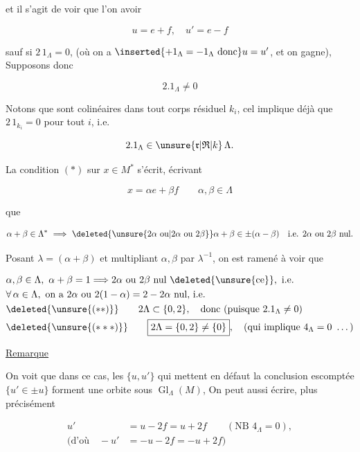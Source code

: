 

et il s'agit de voir que l'on  avoir

\[
u=e+f,\quad u'=e-f
\]

sauf  si $2\,1_\Lambda=0$, (où on a $\inserted{+1_\Lambda=-1_\Lambda\ \text{donc}}u=u'$, et on gagne),  Supposons donc

\[
2.1_\Lambda\ne0
\]

Notons que  sont colinéaires dans tout corps résiduel $k_i$, cel implique déjà que $2\,1_{k_i}=0$ pour tout $i$, i.e.

\[
2.1_\Lambda\in\unsure{\mathfrak r|\mathfrak R|k}\,\Lambda.
\]

La condition $(*)$ sur $x\in M^*$ s'écrit, écrivant

\[
x=\alpha e+\beta f\qquad\alpha,\beta\in\Lambda
\]

que

\[
\alpha+\beta\in\Lambda^*\ \Longrightarrow\ \deleted{\unsure{2\alpha\ \text{ou}|2\alpha\ \text{ou }2\beta}}\alpha+\beta\in\pm(\alpha-\beta)\quad\text{i.e. }2\alpha\ \text{ou }2\beta\ \text{nul.}
\]

Posant $\lambda=(\alpha+\beta)$ et multipliant $\alpha,\beta$ par $\lambda^{-1}$, on est ramené à voir que

\[
\begin{aligned}
&\alpha,\beta\in\Lambda,\ \alpha+\beta=1\Longrightarrow 2\alpha\ \text{ou }2\beta\ \text{nul }\deleted{\unsure{\text{ce}}},\ \text{i.e.}\\
&\forall\,\alpha\in\Lambda,\ \text{on a }2\alpha\ \text{ou }2(1-\alpha)=2-2\alpha\ \text{nul, i.e.}\\
&\deleted{\unsure{(**)}}\qquad 2\Lambda\subset\{0,2\},\quad\text{donc (puisque }2.1_\Lambda\ne0\text{)}\\
&\deleted{\unsure{(***)}}\qquad \boxed{2\Lambda=\{0,2\}\ne\{0\}},\quad\text{(qui implique }4_\Lambda=0\ \ldots\text{)}
\end{aligned}
\]

\uline{Remarque}

On voit que dans ce cas, les  $\{u,u'\}$ qui mettent en défaut la conclusion escomptée $\{u'\in\pm u\}$ forment une orbite sous $\operatorname{Gl}_\Lambda(M)$, On peut aussi écrire, plus précisément

\[
\begin{aligned}
u'&=u-2f=u+2f\qquad(\text{NB }4_\Lambda=0),\\
(\text{d'où}\quad -u'&=-u-2f=-u+2f)
\end{aligned}
\]

